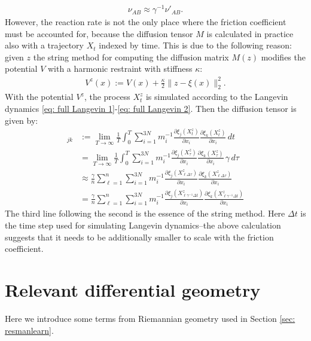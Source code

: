 \documentclass[reqno, 12pt]{article}
\begin{document}
\begin{align}
\nu_{AB} \approx \gamma^{-1}\nu'_{AB}.    
\end{align}
However, the reaction rate is not the only place where the friction coefficient must be accounted for, because the diffusion tensor $M$ is calculated in practice also with a trajectory $X_t$ indexed by time. This is due to the following reason: given $z$ the string method \cite{maragliano2006string} for computing the diffusion matrix $M(z)$ modifies the potential $V$ with a harmonic restraint with stiffness $\kappa$:
\begin{align}
    V^{z}(x) := V(x) + \frac{\kappa}{2}\|z-\xi(x)\|_{2}^{2}. \label{eq: modified potential for diffusion tensor}
\end{align}
With the potential $V^z$, the process $X^z_{t}$ is simulated according to the Langevin dynamics \eqref{eq: full Langevin 1}-\eqref{eq: full Langevin 2}. Then the diffusion tensor is given by:
\begin{align}
    [M(z)]_{jk} &:= \lim_{T \to \infty}\frac{1}{T}\int_{0}^{T}\sum_{i=1}^{3N}m^{-1}_{i}\frac{\partial\xi_{j}(X^{z}_{t})}{\partial x_i}\frac{\partial\xi_{k}(X^{z}_{t})}{\partial x_i}\,dt \\
    &= \lim_{T \to \infty}\frac{1}{T}\int_{0}^{T}\sum_{i=1}^{3N}m^{-1}_{i}\frac{\partial\xi_{j}(X^{z}_{\tau})}{\partial x_i}\frac{\partial\xi_{k}(X^{z}_{\tau})}{\partial x_i}\,\gamma\,d\tau \\
    &\approx \frac{\gamma}{n}\sum_{\ell=1}^{n}\sum_{i=1}^{3N}m^{-1}_{i}\frac{\partial\xi_{j}(X^{z}_{\ell \Delta \tau})}{\partial x_i}\frac{\partial\xi_{k}(X^{z}_{\ell \Delta \tau})}{\partial x_i} \\
    &= \frac{\gamma}{n}\sum_{\ell=1}^{n}\sum_{i=1}^{3N}m^{-1}_{i}\frac{\partial\xi_{j}(X^{z}_{\ell \gamma^{-1}\Delta t})}{\partial x_i}\frac{\partial\xi_{k}(X^{z}_{\ell \gamma^{-1}\Delta t})}{\partial x_i}
\end{align}
The third line following the second is the essence of the string method. Here $\Delta t$ is the time step used for simulating Langevin dynamics--the above calculation suggests that it needs to be additionally smaller to scale with the friction coefficient. 

\section{Relevant differential geometry}
\label{app: B}
Here we introduce some terms from Riemannian geometry used in Section \ref{sec: resmanlearn}. 
\end{document}
